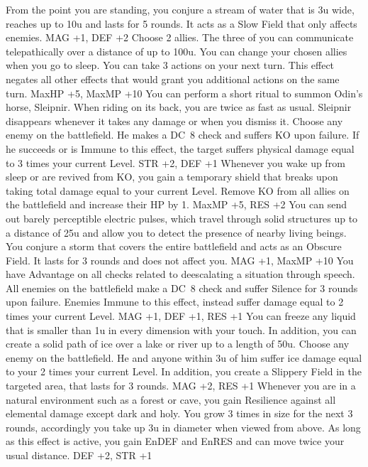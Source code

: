 {From the point you are standing, you conjure a stream of water that is 3u wide, reaches up to 10u and lasts for 5 rounds. It acts as a Slow Field that only affects enemies.}
{MAG +1, DEF +2}
%
\vfill
%
{Choose 2 allies. The three of you can communicate telepathically over a distance of up to 100u. You can change your chosen allies when you go to sleep.}
{You can take 3 actions on your next turn. This effect negates all other effects that would grant you additional actions on the same turn.}
{MaxHP +5, MaxMP +10}
%
\clearpage
%
{You can perform a short ritual to summon Odin's horse, Sleipnir. When riding on its back, you are twice as fast as usual. Sleipnir disappears whenever it takes any damage or when you dismiss it.}
{Choose any enemy on the battlefield. He makes a DC~8 check and suffers KO upon failure. If he succeeds or is Immune to this effect, the target suffers physical damage equal to 3 times your current Level.}
{STR +2, DEF +1}
%
\vfill
%
{Whenever you wake up from sleep or are revived from KO, you gain a temporary shield that breaks upon taking total damage equal to your current Level.}
{Remove KO from all allies on the battlefield and increase their HP by 1.}
{MaxMP +5, RES +2}
%
\vfill
%
{You can send out barely perceptible electric pulses, which travel through solid structures up to a distance of 25u and allow you to detect the presence of nearby living beings.}
{You conjure a storm  that covers the entire battlefield and acts as an Obscure Field. It lasts for 3 rounds and does not affect you.}
{MAG +1, MaxMP +10}
%
\vfill
%
{You have Advantage on all checks related to deescalating a situation through speech.}
{All enemies on the battlefield make a DC~8 check and suffer Silence for 3 rounds upon failure. Enemies Immune to this effect, instead suffer damage equal to 2 times your current Level.}
{MAG +1, DEF +1, RES +1}
%
\vfill
%
{You can freeze any liquid that is smaller than 1u in every dimension with your touch. In addition, you can create a solid path of ice over a lake or river up to a length of 50u.}
{Choose any enemy on the battlefield. He and anyone within 3u of him suffer ice damage equal to your 2 times your current Level. In addition, you create a Slippery Field in the targeted area, that lasts for 3 rounds.}
{MAG +2, RES +1}
%
\vfill
%
{Whenever you are in a natural environment such as a forest or cave, you gain Resilience against all elemental damage except dark and holy.}
{You grow 3 times in size for the next 3 rounds, accordingly you take up 3u in diameter when viewed from above. As long as this effect is active, you gain EnDEF and EnRES and can move twice your usual distance.}
{DEF +2, STR +1}
%
\clearpage